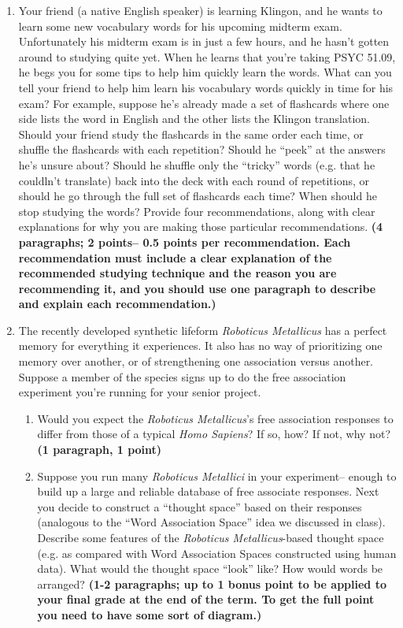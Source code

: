 \documentclass[11pt]{article}
\begin{document}
\begin{enumerate}
\item Your friend (a native English speaker) is learning Klingon, and
  he wants to learn some new vocabulary words for his upcoming midterm
  exam.  Unfortunately his midterm exam is in just a few hours, and he
  hasn't gotten around to studying quite yet.  When he learns that
  you're taking PSYC 51.09, he begs you for some tips to help him
  quickly learn the words.  What can you tell your friend to help him
  learn his vocabulary words quickly in time for his exam?  For
  example, suppose he's already made a set of flashcards where one
  side lists the word in English and the other lists the Klingon
  translation.  Should your friend study the flashcards in the same
  order each time, or shuffle the flashcards with each repetition?
  Should he ``peek'' at the answers he's unsure about?  Should he
  shuffle only the ``tricky'' words (e.g. that he couldln't translate)
  back into the deck with each round of repetitions, or should he go
  through the full set of flashcards each time?  When should he stop
  studying the words?  Provide four recommendations, along with clear
  explanations for why you are making those particular
  recommendations.  \textbf{(4 paragraphs; 2 points-- 0.5 points per
    recommendation.  Each recommendation must include a clear
    explanation of the recommended studying technique and the reason
    you are recommending it, and you should use one paragraph to
    describe and explain each recommendation.)}

\item The recently developed synthetic lifeform \textit{Roboticus Metallicus} has a
  perfect memory for everything it experiences.  It also has no way of
  prioritizing one memory over another, or of strengthening one
  association versus another.  Suppose a member of the species signs
  up to do the free association experiment you're running for your
  senior project.
\begin{enumerate}
\item Would you expect the \textit{Roboticus Metallicus}'s free
  association responses to differ from those of a typical \textit{Homo
    Sapiens}?  If so, how?  If not, why not?  \textbf{(1 paragraph, 1
    point)}
\item Suppose you run many \textit{Roboticus Metallici} in your
  experiment-- enough to build up a large and reliable database of free
  associate responses.  Next you decide to construct a ``thought space''
  based on their responses (analogous to the ``Word Association
  Space'' idea we discussed in class).  Describe some features of the
  \textit{Roboticus Metallicus}-based thought space (e.g. as compared
  with Word Association Spaces constructed using human data).
  What would the thought space ``look'' like?  How would words be
  arranged?
  \textbf{(1-2 paragraphs; up to 1 bonus point to be applied to your
    final grade at the end of the term.  To get the full point you
    need to have some sort of diagram.)}
\end{enumerate}
\end{enumerate}
\end{document}

